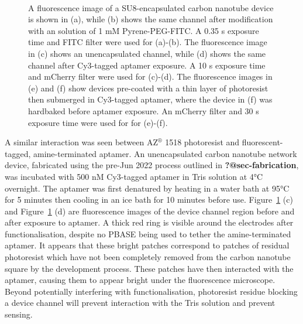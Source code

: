\documentclass[
  a4paper,
]{scrbook}
\begin{document}
\begin{figure}
\begin{minipage}[t]{0.45\linewidth}
{{}

}

\end{minipage}%
%
\begin{minipage}[t]{0.01\linewidth}

{\centering 

~

}

\end{minipage}%

\caption{\label{fig-photoresist-contamination}A fluorescence image of a
SU8-encapsulated carbon nanotube device is shown in (a), while (b) shows
the same channel after modification with an solution of 1 mM
Pyrene-PEG-FITC. A 0.35 s exposure time and FITC filter were used for
(a)-(b). The fluorescence image in (c) shows an unencapsulated channel,
while (d) shows the same channel after Cy3-tagged aptamer exposure. A 10
s exposure time and mCherry filter were used for (c)-(d). The
fluorescence images in (e) and (f) show devices pre-coated with a thin
layer of photoresist then submerged in Cy3-tagged aptamer, where the
device in (f) was hardbaked before aptamer exposure. An mCherry filter
and 30 s exposure time were used for for (e)-(f).}

\end{figure}

A similar interaction was seen between AZ\(^\circledR\) 1518 photoresist
and fluorescent-tagged, amine-terminated aptamer. An unencapsulated
carbon nanotube network device, fabricated using the pre-Jun 2022
process outlined in \textbf{?@sec-fabrication}, was incubated with 500
nM Cy3-tagged aptamer in Tris solution at 4°C overnight. The aptamer was
first denatured by heating in a water bath at 95°C for 5 minutes then
cooling in an ice bath for 10 minutes before use.
Figure~\ref{fig-photoresist-contamination} (c) and
Figure~\ref{fig-photoresist-contamination} (d) are fluorescence images
of the device channel region before and after exposure to aptamer. A
thick red ring is visible around the electrodes after functionalisation,
despite no PBASE being used to tether the amine-terminated aptamer. It
appears that these bright patches correspond to patches of residual
photoresist which have not been completely removed from the carbon
nanotube square by the development process. These patches have then
interacted with the aptamer, causing them to appear bright under the
fluorescence microscope. Beyond potentially interfering with
functionalisation, photoresist residue blocking a device channel will
prevent interaction with the Tris solution and prevent sensing.
\end{document}
